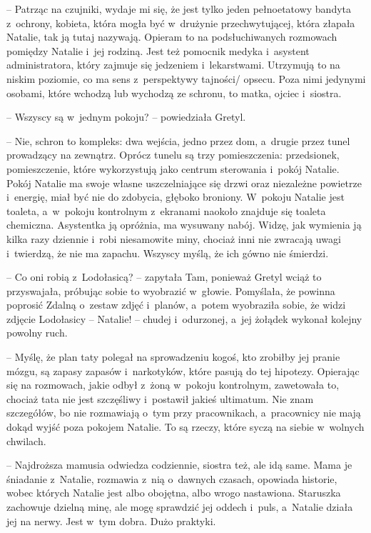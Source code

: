 \documentclass[oneside,polish,11pt,sfheadings]{mwbk}
\begin{document}
-- Patrząc na czujniki, wydaje mi się, że jest tylko jeden pełnoetatowy
bandyta z~ochrony, kobieta, która mogła być w~drużynie przechwytującej,
która złapała Natalie, tak ją tutaj nazywają. Opieram to na
podsłuchiwanych rozmowach pomiędzy Natalie i~jej rodziną. Jest też
pomocnik medyka i~asystent administratora, który zajmuje się jedzeniem i~lekarstwami. Utrzymują to na niskim poziomie, co ma sens z~perspektywy
tajności/ opsecu. Poza nimi jedynymi osobami, które wchodzą lub wychodzą
ze schronu, to matka, ojciec i~siostra.

-- Wszyscy są w~jednym pokoju? -- powiedziała Gretyl.

-- Nie, schron to kompleks: dwa wejścia, jedno przez dom, a~drugie przez
tunel prowadzący na zewnątrz. Oprócz tunelu są trzy pomieszczenia:
przedsionek, pomieszczenie, które wykorzystują jako centrum sterowania i~pokój Natalie. Pokój Natalie ma swoje własne uszczelniające się drzwi
oraz niezależne powietrze i~energię, miał być nie do zdobycia, głęboko
broniony. W~pokoju Natalie jest toaleta, a~w~pokoju kontrolnym z~ekranami naokoło znajduje się toaleta chemiczna. Asystentka ją opróżnia,
ma wysuwany nabój. Widzę, jak wymienia ją kilka razy dziennie i~robi
niesamowite miny, chociaż inni nie zwracają uwagi i~twierdzą, że nie ma
zapachu. Wszyscy myślą, że ich gówno nie śmierdzi.

-- Co oni robią z~Lodołasicą? -- zapytała Tam, ponieważ Gretyl wciąż to
przyswajała, próbując sobie to wyobrazić w~głowie. Pomyślała, że powinna
poprosić Zdalną o~zestaw zdjęć i~planów, a~potem wyobraziła sobie, że
widzi zdjęcie Lodołasicy -- Natalie! -- chudej i~odurzonej, a~jej żołądek
wykonał kolejny powolny ruch.

-- Myślę, że plan taty polegał na sprowadzeniu kogoś, kto zrobiłby jej
pranie mózgu, są zapasy zapasów i~narkotyków, które pasują do tej
hipotezy. Opierając się na rozmowach, jakie odbył z~żoną w~pokoju
kontrolnym, zawetowała to, chociaż tata nie jest szczęśliwy i~postawił
jakieś ultimatum. Nie znam szczegółów, bo nie rozmawiają o~tym przy
pracownikach, a~pracownicy nie mają dokąd wyjść poza pokojem Natalie. To
są rzeczy, które syczą na siebie w~wolnych chwilach.

-- Najdroższa mamusia odwiedza codziennie, siostra też, ale idą same.
Mama je śniadanie z~Natalie, rozmawia z~nią o~dawnych czasach, opowiada
historie, wobec których Natalie jest albo obojętna, albo wrogo
nastawiona. Staruszka zachowuje dzielną minę, ale mogę sprawdzić jej
oddech i~puls, a~Natalie działa jej na nerwy. Jest w~tym dobra. Dużo
praktyki.
\end{document}
